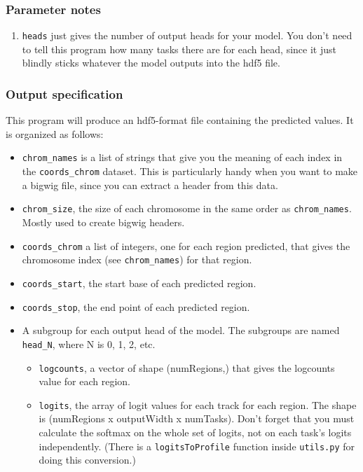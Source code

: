 \documentclass{article}
\begin{document}
\subsubsection{Parameter notes}

\begin{enumerate}
    \item \texttt{heads} just gives the number of output heads for your model. You don't need to
        tell this program how many tasks there are for each head, since it just blindly sticks
        whatever the model outputs into the hdf5 file.
\end{enumerate}

\subsubsection{Output specification}

This program will produce an hdf5-format file containing the predicted values.
It is organized as follows:

\begin{itemize}
    \item \texttt{chrom\_names} is a list of strings that give you the meaning of each index in
        the \texttt{coords\_chrom} dataset.
        This is particularly handy when you want to make a bigwig file, since you can extract a
        header from this data.
    \item \texttt{chrom\_size}, the size of each chromosome in the same order as
        \texttt{chrom\_names}. Mostly used to create bigwig headers.
    \item \texttt{coords\_chrom} a list of integers, one for each region predicted, that gives
        the chromosome index (see \texttt{chrom\_names}) for that region.
    \item \texttt{coords\_start}, the start base of each predicted region.
    \item \texttt{coords\_stop}, the end point of each predicted region.
    \item A subgroup for each output head of the model. The subgroups are named
        \texttt{head\_N}, where N is 0, 1, 2, etc.
        \begin{itemize}
            \item \texttt{logcounts}, a vector of shape (numRegions,) that gives the logcounts
                value for each region.
            \item \texttt{logits}, the array of logit values for each track for each region.
                The shape is (numRegions x outputWidth x numTasks).
                Don't forget that you must calculate the softmax on the whole set of logits,
                not on each task's logits independently.
                (There is a \texttt{logitsToProfile} function inside \texttt{utils.py} for
                doing this conversion.)
        \end{itemize}

\end{itemize}
\end{document}
